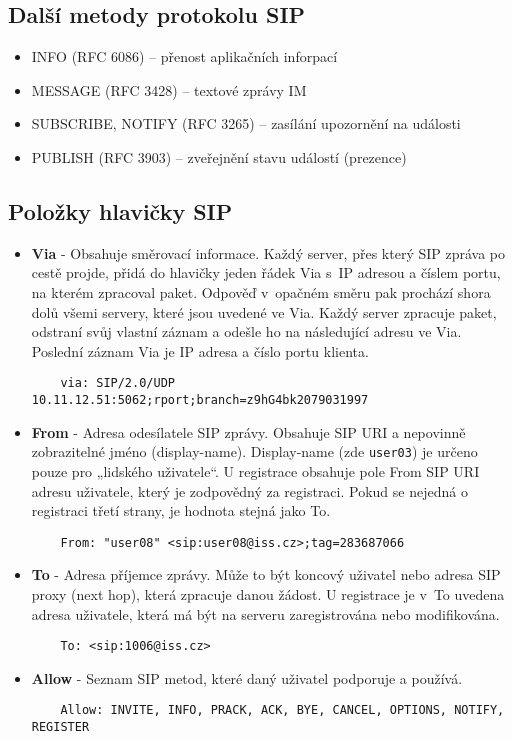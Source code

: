 \subsection*{Další metody protokolu SIP}
\begin{itemize}
    \item INFO (RFC 6086) – přenost aplikačních inforpací
    \item MESSAGE (RFC 3428) – textové zprávy IM
    \item SUBSCRIBE, NOTIFY (RFC 3265) – zasílání upozornění na události
    \item PUBLISH (RFC 3903) – zveřejnění stavu událostí (prezence)
\end{itemize}

\subsection*{Položky hlavičky SIP}
\begin{itemize}
    \item {\bf Via} - Obsahuje směrovací informace. Každý server, přes který SIP zpráva po cestě projde,
    přidá do hlavičky jeden řádek Via s IP adresou a číslem portu, na kterém zpracoval paket. Odpověď v opačném
    směru pak prochází shora dolů všemi servery, které jsou uvedené ve Via. Každý server zpracuje paket,
    odstraní svůj vlastní záznam a odešle ho na následující adresu ve Via. Poslední záznam Via je IP adresa
    a číslo portu klienta.
    \begin{verbatim}
    via: SIP/2.0/UDP 10.11.12.51:5062;rport;branch=z9hG4bk2079031997
    \end{verbatim}
    
    \item {\bf From} - Adresa odesílatele SIP zprávy. Obsahuje SIP URI a nepovinně zobrazitelné jméno (display-name).
    Display-name (zde {\tt user03}) je určeno pouze pro „lidského uživatele“.
    U registrace obsahuje pole From SIP URI adresu uživatele, který je zodpovědný za registraci. Pokud se nejedná o registraci třetí strany, je hodnota stejná jako To.
    \begin{verbatim}
    From: "user08" <sip:user08@iss.cz>;tag=283687066
    \end{verbatim}

    
    \item {\bf To} - Adresa příjemce zprávy. Může to být koncový uživatel nebo adresa SIP proxy (next hop), která zpracuje danou žádost.
    U registrace je v To uvedena adresa uživatele, která má být na serveru zaregistrována nebo modifikována.
    \begin{verbatim}
    To: <sip:1006@iss.cz>
    \end{verbatim}
    
    \item {\bf Allow} - Seznam SIP metod, které daný uživatel podporuje a používá.
    \begin{verbatim}
    Allow: INVITE, INFO, PRACK, ACK, BYE, CANCEL, OPTIONS, NOTIFY, REGISTER
    \end{verbatim}
\end{itemize}

